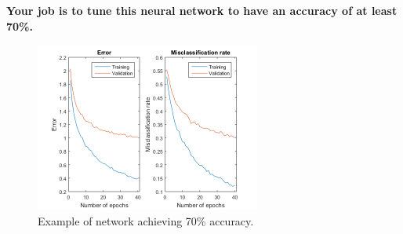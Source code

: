 \documentclass[a4paper,11pt]{article}
\begin{document}
\textbf{Your job is to tune this neural network to have an accuracy of at least 70\%.}\\

\begin{figure}[h]
	\centering
	\includegraphics[width=0.66\textwidth]{training_loss.png}
	\caption{Example of network achieving 70\% accuracy.}
\end{figure}
\end{document}
